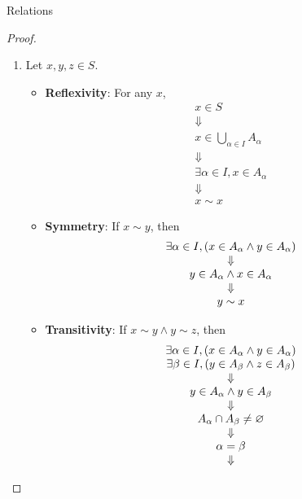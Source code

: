 \begin{section}{Relations}
\begin{proof}
    \begin{enumerate}[label=\textbf{(\Alph*)}]
        \item Let $x, y, z \in S$.
        \begin{itemize}
            \item \textbf{Reflexivity}: For any $x$,
            \[
            \begin{array}{c}
            x \in S \\
            \Downarrow \\
            x \in \displaystyle \bigcup_{\alpha \in I} A_{\alpha} \\
            \Downarrow \\
            \exists \alpha \in I, x \in A_{\alpha} \\
            \Downarrow \\
            x \sim x
            \end{array}
            \]
            \item \textbf{Symmetry}: If $x \sim y$, then
            \[
            \begin{array}{c}
            \exists \alpha \in I, \paren*{x \in A_{\alpha} \land y \in A_{\alpha}} \\
            \Downarrow \\
            y \in A_{\alpha} \land x \in A_{\alpha} \\
            \Downarrow \\
            y \sim x
            \end{array}
            \]
            \item \textbf{Transitivity}: If $x \sim y \land y \sim z$, then
            \[
            \begin{array}{c}
            \exists \alpha \in I, \paren*{x \in A_{\alpha} \land y \in A_{\alpha}} \\
            \exists \beta \in I, \paren*{y \in A_{\beta} \land z \in A_{\beta}} \\
            \Downarrow \\
            y \in A_{\alpha} \land y \in A_{\beta} \\
            \Downarrow \\
            A_{\alpha} \cap A_{\beta} \neq \vnot \\
            \Downarrow \\
            \alpha = \beta \\
            \Downarrow \\

\end{array}\]
\end{itemize}
\end{enumerate}
\end{proof}
\end{section}
